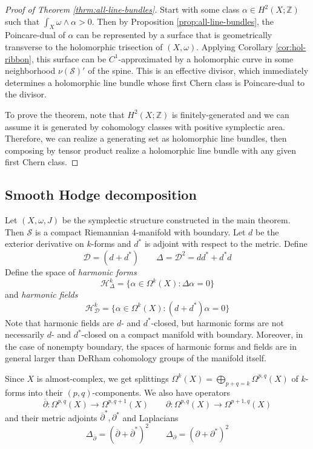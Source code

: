 \documentclass[11pt]{amsart}
\theoremstyle{definition}
\theoremstyle{remark}
\numberwithin{equation}{section}
\newcommand{\cH}{\mathcal{H}}
\newcommand{\ZZ}{\mathbb{Z}}
\newcommand{\dbar}{\overline{\del}}
\newcommand{\cD}{\mathcal{D}}
\newcommand{\cS}{\mathcal{S}}
\newcommand{\del}{\partial}
\begin{document}
\begin{proof}[Proof of Theorem \ref{thrm:all-line-bundles}]

Start with some class $\alpha \in H^2(X;\ZZ)$ such that $\int_X \omega \wedge \alpha > 0$.  Then by Proposition \ref{prop:all-line-bundles}, the Poincare-dual of $\alpha$ can be represented by a surface that is geometrically transverse to the holomorphic trisection of $(X,\omega)$.  Applying Corollary \ref{cor:hol-ribbon}, this surface can be $C^1$-approximated by a holomorphic curve in some neighborhood $\nu(\cS)'$ of the spine.  This is an effective divisor, which immediately determines a holomorphic line bundle whose first Chern class is Poincare-dual to the divisor.  

To prove the theorem, note that $H^2(X;\ZZ)$ is finitely-generated and we can assume it is generated by cohomology classes with positive symplectic area.  Therefore, we can realize a generating set as holomorphic line bundles, then composing by tensor product realize a holomorphic line bundle with any given first Chern class.
\end{proof}




\subsection{Smooth Hodge decomposition}

Let $(X,\omega,J)$ be the symplectic structure constructed in the main theorem.  Then $\cS$ is a compact Riemannian 4-manifold with boundary.  Let $d$ be the exterior derivative on $k$-forms and $d^*$ is adjoint with respect to the metric.  Define
\[\cD = (d + d^*) \qquad \Delta = \cD^2 = d d^* + d^* d\]
Define the space of {\it harmonic forms}
\[\cH^k_{\Delta} = \{\alpha \in \Omega^k(X) : \Delta \alpha = 0\} \]
and {\it harmonic fields}
\[\cH^k_{\cD} = \{\alpha \in \Omega^k(X) : (d + d^*) \alpha = 0\}\]
Note that harmonic fields are $d$- and $d^*$-closed, but harmonic forms are not necessarily $d$- and $d^*$-closed on a compact manifold with boundary.  Moreover, in the case of nonempty boundary, the spaces of harmonic forms and fields are in general larger than DeRham cohomology groups of the manifold itself.

Since $X$ is almost-complex, we get splittings $\Omega^k(X) = \bigoplus_{p+q = k} \Omega^{p,q}(X)$ of $k$-forms into their $(p,q)$-components.  We also have operators
\[\dbar: \Omega^{p,q}(X) \rightarrow \Omega^{p,q+1}(X) \qquad \del: \Omega^{p,q}(X) \rightarrow \Omega^{p+1,q}(X) \]
and their metric adjoints $\dbar^*,\del^*$ and Laplacians
\[\Delta_{\dbar} = (\dbar + \dbar^*)^2 \qquad \Delta_{\del} = (\del + \del^*)^2\]
\end{document}
